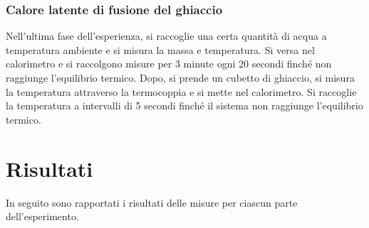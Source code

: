 \documentclass[a4paper]{article}
\begin{document}
\subsubsection{Calore latente di fusione del ghiaccio}
Nell'ultima fase dell'esperienza, si raccoglie una certa quantità di acqua a temperatura ambiente e si misura la massa e temperatura. Si versa nel calorimetro e si raccolgono misure per 3 minute ogni 20 secondi finché non raggiunge l'equilibrio termico. Dopo, si prende un cubetto di ghiaccio, si misura la temperatura attraverso la termocoppia e si mette nel calorimetro. Si raccoglie la temperatura a intervalli di 5 secondi finché il sistema non raggiunge l'equilibrio termico. 

\section{Risultati}
In seguito sono rapportati i risultati delle misure per ciascun parte dell'esperimento. 
\end{document}
